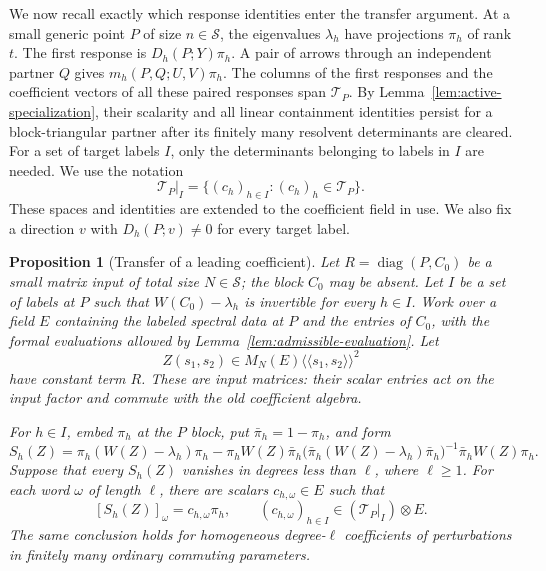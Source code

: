 \documentclass[11pt]{article}
\newtheorem{proposition}[theorem]{Proposition}
\theoremstyle{definition}
\theoremstyle{remark}
\numberwithin{equation}{section}
\begin{document}
We now recall exactly which response identities enter the transfer
argument.  At a small generic point $P$ of size $n\in\mathcal S$, the
eigenvalues $\lambda_h$ have projections $\pi_h$ of rank $t$.  The first
response is $D_h(P;Y)\pi_h$.  A pair of arrows through an independent
partner $Q$ gives $m_h(P,Q;U,V)\pi_h$.  The columns of the first responses
and the coefficient vectors of all these paired responses span
$\mathcal T_P$.  By Lemma~\ref{lem:active-specialization}, their scalarity
and all linear containment identities persist for a block-triangular
partner after its finitely many resolvent determinants are cleared.  For a
set of target labels $I$, only the determinants belonging to labels in $I$
are needed.  We use the notation
\[
 \mathcal T_P|_I=\{(c_h)_{h\in I}:(c_h)_h\in\mathcal T_P\}.
\]
These spaces and identities are extended to the coefficient field in use.
We also fix a direction $v$ with $D_h(P;v)\ne0$ for every target label.

\begin{proposition}[Transfer of a leading coefficient]
\label{prop:word-transfer}
Let $R=\operatorname{diag}(P,C_0)$ be a small matrix input of total size $N\in
\mathcal S$;
the block $C_0$ may be absent.  Let $I$ be a set of labels at
$P$ such that $W(C_0)-\lambda_h$ is invertible for every $h\in I$.
Work over a field $E$ containing the labeled spectral data at $P$ and the
entries of $C_0$, with the formal evaluations allowed by
Lemma~\ref{lem:admissible-evaluation}.  Let
\[
 Z(s_1,s_2)\in M_N(E)\langle\!\langle s_1,s_2\rangle\!\rangle^2
\]
have constant term $R$.  These are input matrices: their scalar entries
act on the input factor and commute with the old coefficient algebra.

For $h\in I$, embed $\pi_h$ at the $P$ block, put $\bar\pi_h=1-\pi_h$,
and form
\[
 S_h(Z)=\pi_h(W(Z)-\lambda_h)\pi_h
 -\pi_hW(Z)\bar\pi_h
 \bigl(\bar\pi_h(W(Z)-\lambda_h)\bar\pi_h\bigr)^{-1}
 \bar\pi_hW(Z)\pi_h.
\]
Suppose that every $S_h(Z)$ vanishes in degrees less than $\ell$, where
$\ell\ge1$.  For each word $\omega$ of length $\ell$, there are scalars
$c_{h,\omega}\in E$ such that
\[
 [S_h(Z)]_\omega=c_{h,\omega}\pi_h,
 \qquad (c_{h,\omega})_{h\in I}\in
        (\mathcal T_P|_I)\otimes E.
\]
The same conclusion holds for homogeneous degree-$\ell$ coefficients of
perturbations in finitely many ordinary commuting parameters.
\end{proposition}
\end{document}
